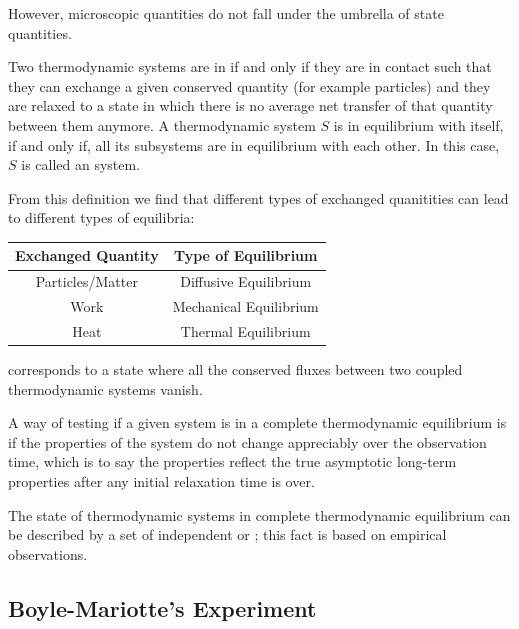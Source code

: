 \documentclass[12pt, a4paper, oneside, openright, titlepage]{book}
\begin{document}
However, microscopic quantities do not fall under the umbrella of state quantities.

\begin{defn}[Equilibrium]
    Two thermodynamic systems are in  if and only if they are in contact such that they can exchange a given conserved quantity (for example particles) and they are relaxed to a state in which there is no average net transfer of that quantity between them anymore. A thermodynamic system $S$ is in equilibrium with itself, if and only if, all its subsystems are in equilibrium with each other. In this case, $S$ is called an  system.
\end{defn}

From this definition we find that different types of exchanged quanitities can lead to different types of equilibria: 

\begin{table}[H]
    \centering
    \begin{tabular}{c|c}
        \hline
        Exchanged Quantity & Type of Equilibrium \\ \hline \hline
        Particles/Matter & Diffusive Equilibrium \\ 
        Work & Mechanical Equilibrium \\
        Heat & Thermal Equilibrium \\ \hline
    \end{tabular}
\end{table}

\begin{defn}
     corresponds to a state where all the conserved fluxes between two coupled thermodynamic systems vanish.
\end{defn}

A way of testing if a given system is in a complete thermodynamic equilibrium is if the properties of the system do not change appreciably over the observation time, which is to say the properties reflect the true asymptotic long-term properties after any initial relaxation time is over.

The state of thermodynamic systems in complete thermodynamic equilibrium can be described by a set of independent  or ; this fact is based on empirical observations. 

\subsection{Boyle-Mariotte's Experiment}
\end{document}
